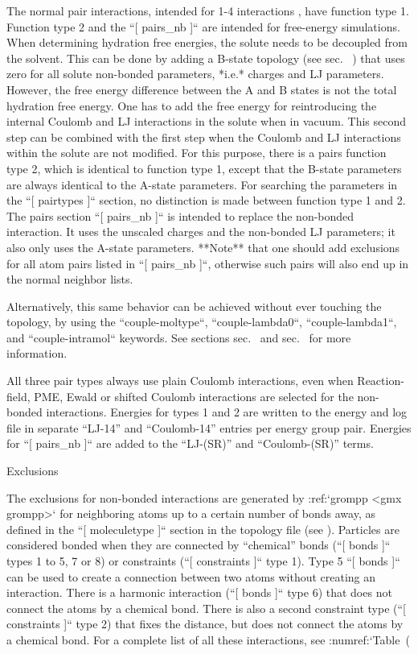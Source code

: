 The normal pair interactions, intended for 1-4
interactions
, have function type 1.
Function type 2 and the ``[ pairs_nb ]`` are intended for
free-energy simulations. When determining hydration free energies, the
solute needs to be decoupled from the solvent. This can be done by
adding a B-state topology (see sec. 
) that
uses zero for all solute non-bonded parameters, *i.e.* charges and LJ
parameters. However, the free energy difference between the A and B
states is not the total hydration free energy. One has to add the free
energy for reintroducing the internal Coulomb and LJ interactions in the
solute when in vacuum. This second step can be combined with the first
step when the Coulomb and LJ interactions within the solute are not
modified. For this purpose, there is a pairs function type 2, which is
identical to function type 1, except that the B-state parameters are
always identical to the A-state parameters. For searching the parameters
in the ``[ pairtypes ]`` section, no distinction is made
between function type 1 and 2. The pairs section
``[ pairs_nb ]`` is intended to replace the non-bonded
interaction. It uses the unscaled charges and the non-bonded LJ
parameters; it also only uses the A-state parameters. **Note** that one
should add exclusions for all atom pairs listed in
``[ pairs_nb ]``, otherwise such pairs will also end up in
the normal neighbor lists.

Alternatively, this same behavior can be achieved without ever touching
the topology, by using the ``couple-moltype``,
``couple-lambda0``, ``couple-lambda1``, and
``couple-intramol`` keywords. See sections
sec. 
and
sec. 
for more information.

All three pair types always use plain Coulomb interactions, even when
Reaction-field, PME, Ewald or shifted Coulomb interactions are selected
for the non-bonded interactions. Energies for types 1 and 2 are written
to the energy and log file in separate “LJ-14” and “Coulomb-14” entries
per energy group pair. Energies for ``[ pairs_nb ]`` are
added to the “LJ-(SR)” and “Coulomb-(SR)” terms.

Exclusions
~~~~~~~~~~

The exclusions
for non-bonded
interactions are generated by :ref:`grompp <gmx grompp>` for neighboring
atoms up to a certain number of bonds away, as defined in the
``[ moleculetype ]`` section in the topology file (see
). Particles are considered bonded when
they are connected by “chemical” bonds (``[ bonds ]`` types
1 to 5, 7 or 8) or constraints (``[ constraints ]`` type 1).
Type 5 ``[ bonds ]`` can be used to create a
connection
between two atoms without
creating an interaction. There is a harmonic
interaction
(``[ bonds ]`` type 6) that does not connect the atoms by a
chemical bond. There is also a second constraint type
(``[ constraints ]`` type 2) that fixes the distance, but
does not connect the atoms by a chemical bond. For a complete list of
all these interactions, see :numref:`Table (%

